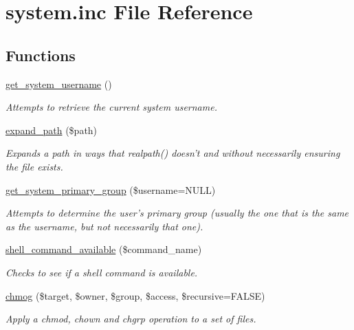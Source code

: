 \hypertarget{system_8inc}{\section{system.\-inc File Reference}
\label{system_8inc}
}
\subsection*{Functions}
\begin{DoxyCompactItemize}
\item 
\hyperlink{system_8inc_a9ee2cecceab0183d4131fb3bada09b06}{get\-\_\-system\-\_\-username} ()
\begin{DoxyCompactList}\small\item\em Attempts to retrieve the current system username. \end{DoxyCompactList}\item 
\hyperlink{system_8inc_a42c75bda6715af3454dc8780c4ff2fe5}{expand\-\_\-path} (\$path)
\begin{DoxyCompactList}\small\item\em Expands a path in ways that realpath() doesn't and without necessarily ensuring the file exists. \end{DoxyCompactList}\item 
\hyperlink{system_8inc_a2f17c192f771840162549a7ec741723f}{get\-\_\-system\-\_\-primary\-\_\-group} (\$username=N\-U\-L\-L)
\begin{DoxyCompactList}\small\item\em Attempts to determine the user's primary group (usually the one that is the same as the username, but not necessarily that one). \end{DoxyCompactList}\item 
\hyperlink{system_8inc_a45b2a5f8e0b0ecf6c6751b2af8500a57}{shell\-\_\-command\-\_\-available} (\$command\-\_\-name)
\begin{DoxyCompactList}\small\item\em Checks to see if a shell command is available. \end{DoxyCompactList}\item 
\hyperlink{system_8inc_ad69548f9b921ea81ee4b4e0f64101ba7}{chmog} (\$target, \$owner, \$group, \$access, \$recursive=F\-A\-L\-S\-E)
\begin{DoxyCompactList}\small\item\em Apply a chmod, chown and chgrp operation to a set of files. \end{DoxyCompactList}\item 

\end{DoxyCompactItemize}
